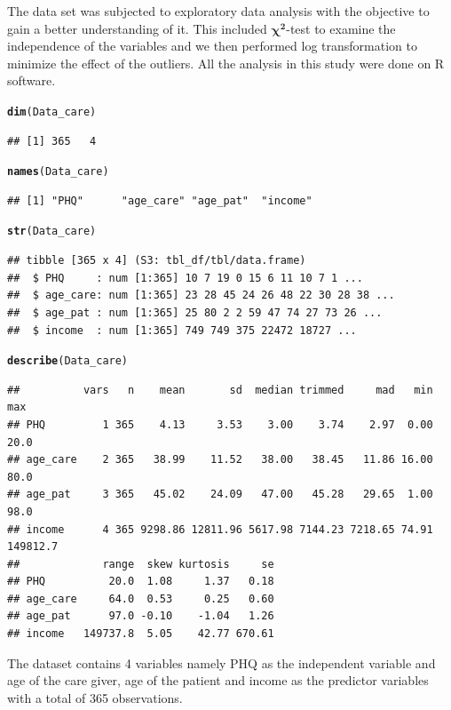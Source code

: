 \documentclass[11pt]{article}\usepackage[]{graphicx}\usepackage[]{xcolor}
\makeatletter
\newcommand{\hlstd}[1]{\textcolor[rgb]{0.345,0.345,0.345}{#1}}%
\newcommand{\hlkwd}[1]{\textcolor[rgb]{0.737,0.353,0.396}{\textbf{#1}}}%
\newenvironment{kframe}{%
 \def\at@end@of@kframe{}%
 \ifinner\ifhmode%
  \def\at@end@of@kframe{\end{minipage}}%
  \begin{minipage}{\columnwidth}%
 \fi\fi%
 \def\FrameCommand##1{\hskip\@totalleftmargin \hskip-\fboxsep
 \colorbox{shadecolor}{##1}\hskip-\fboxsep
     \hskip-\linewidth \hskip-\@totalleftmargin \hskip\columnwidth}%
 \MakeFramed {\advance\hsize-\width
   \@totalleftmargin\z@ \linewidth\hsize
   \@setminipage}}%
 {\par\unskip\endMakeFramed%
 \at@end@of@kframe}
\newenvironment{knitrout}{}{} %
\numberwithin{equation}{section}
\numberwithin{table}{section}
\makeatother
\begin{document}
The data set was subjected to exploratory data analysis with the objective to gain a better understanding of it. This included $\boldsymbol{\chi^2}$-test to examine the independence of the variables and we then performed log transformation to minimize the effect of the outliers. All the analysis in this study were done on R software.
\begin{knitrout}
\color{fgcolor}\begin{kframe}
\begin{alltt}
\hlkwd{dim}\hlstd{(Data_care)}
\end{alltt}
\begin{verbatim}
## [1] 365   4
\end{verbatim}
\begin{alltt}
\hlkwd{names}\hlstd{(Data_care)}
\end{alltt}
\begin{verbatim}
## [1] "PHQ"      "age_care" "age_pat"  "income"
\end{verbatim}
\begin{alltt}
\hlkwd{str}\hlstd{(Data_care)}
\end{alltt}
\begin{verbatim}
## tibble [365 x 4] (S3: tbl_df/tbl/data.frame)
##  $ PHQ     : num [1:365] 10 7 19 0 15 6 11 10 7 1 ...
##  $ age_care: num [1:365] 23 28 45 24 26 48 22 30 28 38 ...
##  $ age_pat : num [1:365] 25 80 2 2 59 47 74 27 73 26 ...
##  $ income  : num [1:365] 749 749 375 22472 18727 ...
\end{verbatim}
\begin{alltt}
\hlkwd{describe}\hlstd{(Data_care)}
\end{alltt}
\begin{verbatim}
##          vars   n    mean       sd  median trimmed     mad   min      max
## PHQ         1 365    4.13     3.53    3.00    3.74    2.97  0.00     20.0
## age_care    2 365   38.99    11.52   38.00   38.45   11.86 16.00     80.0
## age_pat     3 365   45.02    24.09   47.00   45.28   29.65  1.00     98.0
## income      4 365 9298.86 12811.96 5617.98 7144.23 7218.65 74.91 149812.7
##             range  skew kurtosis     se
## PHQ          20.0  1.08     1.37   0.18
## age_care     64.0  0.53     0.25   0.60
## age_pat      97.0 -0.10    -1.04   1.26
## income   149737.8  5.05    42.77 670.61
\end{verbatim}
\end{kframe}
\end{knitrout}
\noindent The dataset contains 4 variables namely PHQ as the independent variable and age of the care giver, age of the patient and income as the predictor variables with a total of 365 observations.
\end{document}
